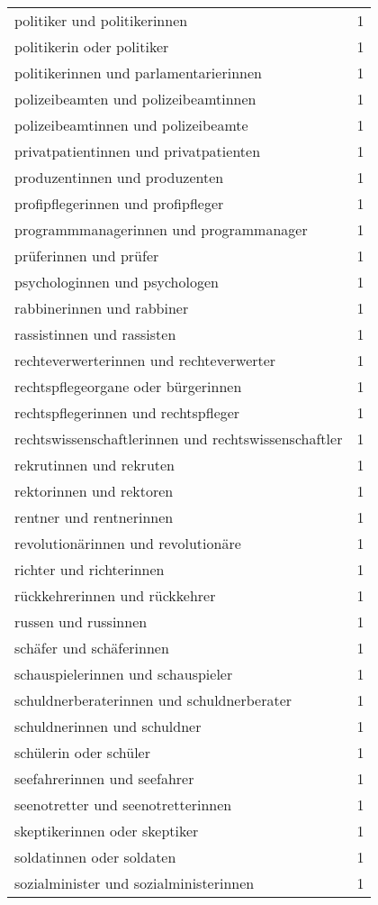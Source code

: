 \begin{tabular}{ll}
politiker und politikerinnen & 1\\
politikerin oder politiker & 1\\
politikerinnen und parlamentarierinnen & 1\\
polizeibeamten und polizeibeamtinnen & 1\\
polizeibeamtinnen und polizeibeamte & 1\\
privatpatientinnen und privatpatienten & 1\\
produzentinnen und produzenten & 1\\
profipflegerinnen und profipfleger & 1\\
programmmanagerinnen und programmanager & 1\\
prüferinnen und prüfer & 1\\
psychologinnen und psychologen & 1\\
rabbinerinnen und rabbiner & 1\\
rassistinnen und rassisten & 1\\
rechteverwerterinnen und rechteverwerter & 1\\
rechtspflegeorgane oder bürgerinnen & 1\\
rechtspflegerinnen und rechtspfleger & 1\\
rechtswissenschaftlerinnen und rechtswissenschaftler & 1\\
rekrutinnen und rekruten & 1\\
rektorinnen und rektoren & 1\\
rentner und rentnerinnen & 1\\
revolutionärinnen und revolutionäre & 1\\
richter und richterinnen & 1\\
rückkehrerinnen und rückkehrer & 1\\
russen und russinnen & 1\\
schäfer und schäferinnen & 1\\
schauspielerinnen und schauspieler & 1\\
schuldnerberaterinnen und schuldnerberater & 1\\
schuldnerinnen und schuldner & 1\\
schülerin oder schüler & 1\\
seefahrerinnen und seefahrer & 1\\
seenotretter und seenotretterinnen & 1\\
skeptikerinnen oder skeptiker & 1\\
soldatinnen oder soldaten & 1\\
sozialminister und sozialministerinnen & 1\\

\end{tabular}
